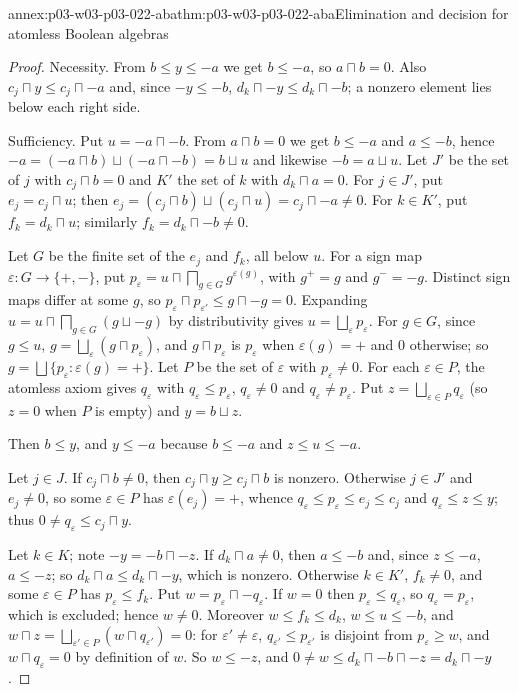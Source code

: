 \begin{annexitem}{annex:p03-w03-p03-022-aba}{thm:p03-w03-p03-022-aba}{Elimination and decision for atomless Boolean algebras}
\begin{proof}
Necessity. From \(b\le y\le-a\) we get \(b\le-a\), so \(a\sqcap b=0\).
Also \(c_j\sqcap y\le c_j\sqcap-a\) and, since \(-y\le-b\),
\(d_k\sqcap-y\le d_k\sqcap-b\); a nonzero element lies below each right side.

Sufficiency. Put \(u=-a\sqcap-b\). From \(a\sqcap b=0\) we get \(b\le-a\) and
\(a\le-b\), hence
\(-a=(-a\sqcap b)\sqcup(-a\sqcap-b)=b\sqcup u\) and likewise \(-b=a\sqcup u\).
Let \(J'\) be the set of \(j\) with \(c_j\sqcap b=0\) and \(K'\) the set of
\(k\) with \(d_k\sqcap a=0\). For \(j\in J'\), put \(e_j=c_j\sqcap u\); then
\(e_j=(c_j\sqcap b)\sqcup(c_j\sqcap u)=c_j\sqcap-a\ne0\). For \(k\in K'\), put
\(f_k=d_k\sqcap u\); similarly \(f_k=d_k\sqcap-b\ne0\).

Let \(G\) be the finite set of the \(e_j\) and \(f_k\), all below \(u\). For a
sign map \(\varepsilon:G\to\{+,-\}\), put
\(p_\varepsilon=u\sqcap\bigsqcap_{g\in G}g^{\varepsilon(g)}\), with \(g^+=g\)
and \(g^-=-g\). Distinct sign maps differ at some \(g\), so
\(p_\varepsilon\sqcap p_{\varepsilon'}\le g\sqcap-g=0\). Expanding
\(u=u\sqcap\bigsqcap_{g\in G}(g\sqcup-g)\) by distributivity gives
\(u=\bigsqcup_\varepsilon p_\varepsilon\). For \(g\in G\), since \(g\le u\),
\(g=\bigsqcup_\varepsilon(g\sqcap p_\varepsilon)\), and \(g\sqcap p_\varepsilon\)
is \(p_\varepsilon\) when \(\varepsilon(g)=+\) and \(0\) otherwise; so
\(g=\bigsqcup\{p_\varepsilon:\varepsilon(g)=+\}\). Let \(P\) be the set of
\(\varepsilon\) with \(p_\varepsilon\ne0\). For each \(\varepsilon\in P\), the
atomless axiom gives \(q_\varepsilon\) with \(q_\varepsilon\le p_\varepsilon\),
\(q_\varepsilon\ne0\) and \(q_\varepsilon\ne p_\varepsilon\). Put
\(z=\bigsqcup_{\varepsilon\in P}q_\varepsilon\) (so \(z=0\) when \(P\) is
empty) and \(y=b\sqcup z\).

Then \(b\le y\), and \(y\le-a\) because \(b\le-a\) and \(z\le u\le-a\).

Let \(j\in J\). If \(c_j\sqcap b\ne0\), then \(c_j\sqcap y\ge c_j\sqcap b\) is
nonzero. Otherwise \(j\in J'\) and \(e_j\ne0\), so some \(\varepsilon\in P\)
has \(\varepsilon(e_j)=+\), whence \(q_\varepsilon\le p_\varepsilon\le e_j\le c_j\)
and \(q_\varepsilon\le z\le y\); thus \(0\ne q_\varepsilon\le c_j\sqcap y\).

Let \(k\in K\); note \(-y=-b\sqcap-z\). If \(d_k\sqcap a\ne0\), then
\(a\le-b\) and, since \(z\le-a\), \(a\le-z\); so
\(d_k\sqcap a\le d_k\sqcap-y\), which is nonzero. Otherwise \(k\in K'\),
\(f_k\ne0\), and some \(\varepsilon\in P\) has \(p_\varepsilon\le f_k\). Put
\(w=p_\varepsilon\sqcap-q_\varepsilon\). If \(w=0\) then
\(p_\varepsilon\le q_\varepsilon\), so \(q_\varepsilon=p_\varepsilon\), which is
excluded; hence \(w\ne0\). Moreover \(w\le f_k\le d_k\), \(w\le u\le-b\), and
\(w\sqcap z=\bigsqcup_{\varepsilon'\in P}(w\sqcap q_{\varepsilon'})=0\): for
\(\varepsilon'\ne\varepsilon\), \(q_{\varepsilon'}\le p_{\varepsilon'}\) is disjoint
from \(p_\varepsilon\ge w\), and \(w\sqcap q_\varepsilon=0\) by definition of
\(w\). So \(w\le-z\), and \(0\ne w\le d_k\sqcap-b\sqcap-z=d_k\sqcap-y\).


\end{proof}
\end{annexitem}
